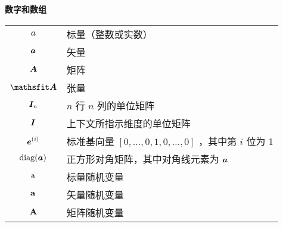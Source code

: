 \vspace{\notationgap}
\begin{minipage}{\textwidth}
\centerline{\bf 数字和数组}
\bgroup
\def\arraystretch{1.5}
\begin{tabular}{cp{3.25in}}
$\displaystyle a$ & 标量（整数或实数）\\
$\displaystyle {\bm{a}}$ & 矢量\\
$\displaystyle {\bm{A}}$ & 矩阵\\
$\displaystyle \tA$ & 张量\\
$\displaystyle {\bm{I}}_n$ &  $n$ 行 $n$ 列的单位矩阵\\
$\displaystyle {\bm{I}}$ & 上下文所指示维度的单位矩阵\\
$\displaystyle {\bm{e}}^{(i)}$ & 标准基向量 $[0,\dots,0,1,0,\dots,0]$ ，其中第 $i$ 位为 1\\
$\displaystyle \text{diag}({\bm{a}})$ & 正方形对角矩阵，其中对角线元素为 ${\bm{a}}$ \\
$\displaystyle {\textnormal{a}}$ & 标量随机变量\\
$\displaystyle {\mathbf{a}}$ & 矢量随机变量\\
$\displaystyle {\mathbf{A}}$ & 矩阵随机变量\\
\end{tabular}
\egroup
{}
\end{minipage}

